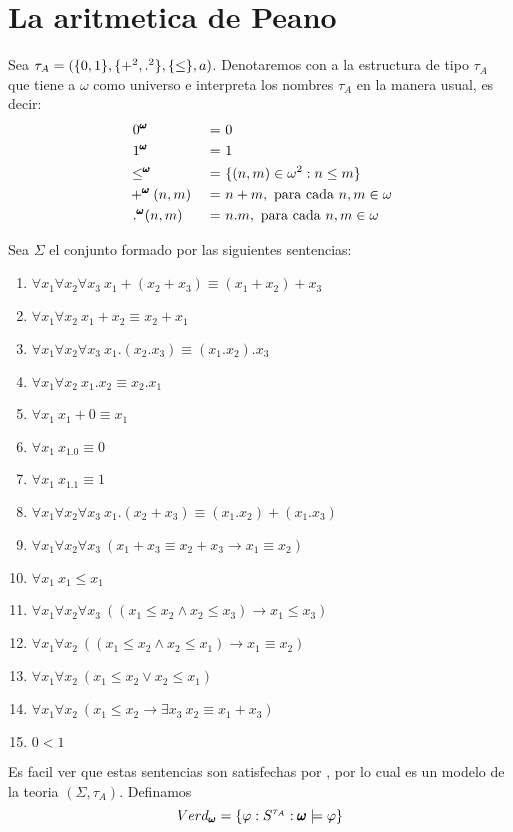 


\section{La aritmetica de Peano}

\begin{definition}
  Sea $\tau_A = (\{0,1\},\{+^2,.^2\},\{\leq\},a)$. Denotaremos con \pomega a la estructura de tipo $\tau_A$
  que tiene a $\omega$ como universo e interpreta los nombres $\tau_A$ en la manera usual, es decir:
  \begin{alignat*}{4}
    &\ 0^{\pmb{\omega}} &\ =&\ 0\\
    &\ 1^{\pmb{\omega}} &\ =&\ 1\\
    &\leq^{\pmb{\omega}} &\ =&\ \{(n,m)\in \omega^2: n\leq m\}\\
    &+^{\pmb{\omega}}(n,m) &\ =&\ n+m, \text{ para cada } n,m\in\omega\\
    &\ .^{\pmb{\omega}}(n,m) &\ =&\ n.m, \text{ para cada } n,m\in\omega
  \end{alignat*}

  Sea $\Sigma$ el conjunto formado por las siguientes sentencias:\begin{enumerate}
    \item $\forall x_1 \forall x_2 \forall x_3\ x_1+(x_2+x_3)\equiv(x_1+x_2)+x_3$
    \item $\forall x_1 \forall x_2\ x_1+x_2\equiv x_2+x_1$
    \item $\forall x_1 \forall x_2 \forall x_3\ x_1.(x_2.x_3)\equiv(x_1.x_2).x_3$
    \item $\forall x_1 \forall x_2\ x_1.x_2\equiv x_2.x_1$ 
    \item $\forall x_1\ x_1+0\equiv x_1$
    \item $\forall x_1\ x_1.0\equiv 0$
    \item $\forall x_1\ x_1.1\equiv 1$
    \item $\forall x_1 \forall x_2 \forall x_3\ x_1.(x_2+x_3)\equiv(x_1.x_2)+(x_1.x_3)$
    \item $\forall x_1 \forall x_2 \forall x_3\ (x_1+x_3\equiv x_2+x_3\rightarrow x_1\equiv x_2)$
    \item $\forall x_1\ x_1\leq x_1$
    \item $\forall x_1 \forall x_2 \forall x_3\ ((x_1\leq x_2\land x_2\leq x_3)\rightarrow x_1\leq x_3)$
    \item $\forall x_1 \forall x_2\ ((x_1\leq x_2 \land x_2\leq x_1)\rightarrow x_1\equiv x_2)$
    \item $\forall x_1 \forall x_2\ (x_1\leq x_2 \lor x_2\leq x_1)$
    \item $\forall x_1 \forall x_2\ (x_1\leq x_2 \rightarrow \exists x_3\ x_2\equiv x_1+x_3)$
    \item $0<1$
  \end{enumerate}

  Es facil ver que estas sentencias son satisfechas por \pomega, por lo cual \pomega es un modelo de la teoria $(\Sigma, \tau_A)$. Definamos
  $$
  Verd_{\pmb{\omega}} = \{\varphi: S^{\tau_A}:\pmb{\omega}\models\varphi\}
  $$

  \end{definition}
